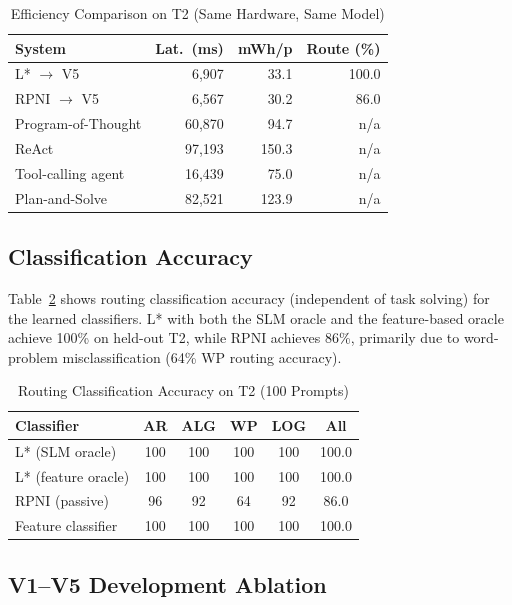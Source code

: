 \documentclass[journal]{IEEEtai}
\begin{document}
\begin{table}[t]
\centering
\caption{Efficiency Comparison on T2 (Same Hardware, Same Model)}
\label{tab:efficiency}
\begin{tabular}{lrrr}
\hline
\textbf{System} & \textbf{Lat.\ (ms)} & \textbf{mWh/p} & \textbf{Route (\%)} \\
\hline
L* $\to$ V5 & 6,907 & 33.1 & 100.0 \\
RPNI $\to$ V5 & 6,567 & 30.2 & 86.0 \\
\hline
Program-of-Thought & 60,870 & 94.7 & n/a \\
ReAct & 97,193 & 150.3 & n/a \\
Tool-calling agent & 16,439 & 75.0 & n/a \\
Plan-and-Solve & 82,521 & 123.9 & n/a \\
\hline
\end{tabular}
\end{table}


\subsection{Classification Accuracy}

Table~\ref{tab:classify} shows routing classification accuracy (independent of task solving) for the learned classifiers. L* with both the SLM oracle and the feature-based oracle achieve 100\% on held-out T2, while RPNI achieves 86\%, primarily due to word-problem misclassification (64\% WP routing accuracy).

\begin{table}[t]
\centering
\caption{Routing Classification Accuracy on T2 (100 Prompts)}
\label{tab:classify}
\begin{tabular}{lccccc}
\hline
\textbf{Classifier} & \textbf{AR} & \textbf{ALG} & \textbf{WP} & \textbf{LOG} & \textbf{All} \\
\hline
L* (SLM oracle) & 100 & 100 & 100 & 100 & 100.0 \\
L* (feature oracle) & 100 & 100 & 100 & 100 & 100.0 \\
RPNI (passive) & 96 & 92 & 64 & 92 & 86.0 \\
Feature classifier & 100 & 100 & 100 & 100 & 100.0 \\
\hline
\end{tabular}
\end{table}

\subsection{V1--V5 Development Ablation}
\end{document}

